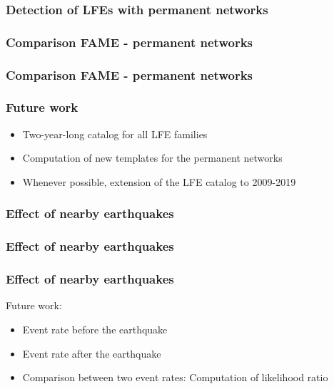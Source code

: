 \documentclass{beamer}
\begin{document}
	\begin{frame}
		\frametitle{Detection of LFEs with permanent networks}
	\end{frame}

	\begin{frame}
		\frametitle{Comparison FAME - permanent networks}
	\end{frame}

	\begin{frame}
		\frametitle{Comparison FAME - permanent networks}
	\end{frame}

	\begin{frame}
		\frametitle{Future work}
		\begin{itemize}
			\item Two-year-long catalog for all LFE families
			\item Computation of new templates for the permanent networks
			\item Whenever possible, extension of the LFE catalog to 2009-2019
		\end{itemize}
	\end{frame}

	\begin{frame}
		\frametitle{Effect of nearby earthquakes}
	\end{frame}

	\begin{frame}
		\frametitle{Effect of nearby earthquakes}
	\end{frame}

	\begin{frame}
		\frametitle{Effect of nearby earthquakes}
		Future work:
		\begin{itemize}
			\item Event rate before the earthquake
			\item Event rate after the earthquake
			\item Comparison between two event rates: Computation of likelihood ratio
		\end{itemize}
	\end{frame}

\end{document}
